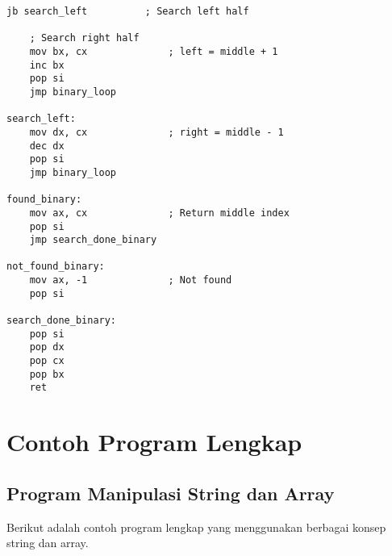 \documentclass[../main.tex]{subfiles}
\begin{document}
\begin{lstlisting}[language={[x86masm]Assembler}, caption=Pencarian dalam Array, label={lst:array-search}]
    jb search_left          ; Search left half
    
    ; Search right half
    mov bx, cx              ; left = middle + 1
    inc bx
    pop si
    jmp binary_loop
    
search_left:
    mov dx, cx              ; right = middle - 1
    dec dx
    pop si
    jmp binary_loop
    
found_binary:
    mov ax, cx              ; Return middle index
    pop si
    jmp search_done_binary
    
not_found_binary:
    mov ax, -1              ; Not found
    pop si
    
search_done_binary:
    pop si
    pop dx
    pop cx
    pop bx
    ret
                \end{lstlisting}

    \section{Contoh Program Lengkap}
        \subsection{Program Manipulasi String dan Array}
            Berikut adalah contoh program lengkap yang menggunakan berbagai konsep string dan array.
\end{document}
